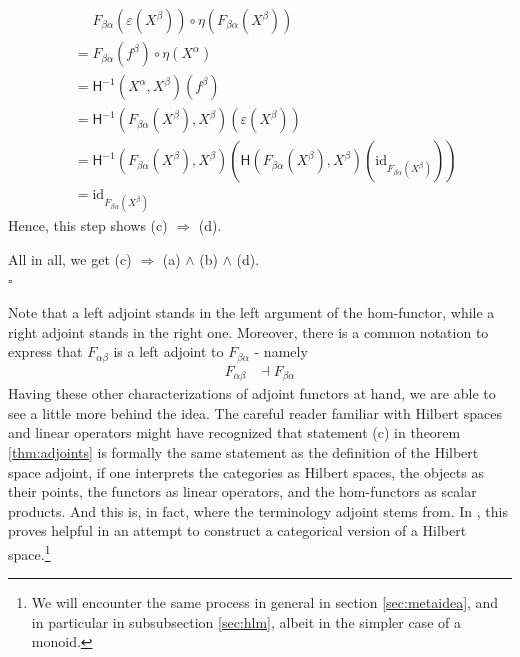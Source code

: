\begin{prf}
\begin{description}
\begin{align*}
  &\phantom{=}
  F_{\beta\alpha}
  \left(
    \varepsilon(X^{\beta})
  \right)
  \circ
  \eta
  \left(
    F_{\beta\alpha}(X^{\beta})
  \right)
  \\
  &=
  F_{\beta\alpha}(f^{\beta})
  \circ
  \eta(X^{\alpha})
  \\
  &=
  \mathsf{H}^{-1}(X^{\alpha},X^{\beta})(f^{\beta})
  \\
  &=
  \mathsf{H}^{-1}
  \left(
    F_{\beta\alpha}(X^{\beta}),
    X^{\beta}
  \right)
  \left(
    \varepsilon(X^{\beta})
  \right)
  \\
  &=
  \mathsf{H}^{-1}
  \left(
    F_{\beta\alpha}(X^{\beta}),
    X^{\beta}
  \right)
  \left(
    \mathsf{H}
    \left(
      F_{\beta\alpha}(X^{\beta}),
      X^{\beta}
    \right)
    \left(
      \mathrm{id}_{F_{\beta\alpha}(X^{\beta})}
    \right)
  \right)
  \\
  &=
  \mathrm{id}_{F_{\beta\alpha}(X^{\beta})}
\end{align*}
Hence, this step shows {\glqq}(c) $\Rightarrow$ (d){\grqq}.
\end{description}
All in all, we get {\glqq}(c) $\Rightarrow$ (a) $\land$ (b) $\land$ (d){\grqq}.
\\
\phantom{proven}
\hfill
$\square$
\end{prf}
Note that a left adjoint stands in the left argument of the hom-functor, while a right adjoint stands in the right one.
Moreover, there is a common notation to express that $F_{\alpha\beta}$ is a left adjoint to $F_{\beta\alpha}$ - namely
\begin{align*}
  F_{\alpha\beta}
  &\dashv
  F_{\beta\alpha}
\end{align*}
Having these other characterizations of adjoint functors at hand, we are able to see a little more behind the idea.
The careful reader familiar with Hilbert spaces and linear operators might have recognized that statement (c) in theorem \ref{thm:adjoints} is formally the same statement as the definition of the Hilbert space adjoint, if one interprets the categories as Hilbert spaces, the objects as their points, the functors as linear operators, and the hom-functors as scalar products.
And this is, in fact, where the terminology {\glqq}adjoint{\grqq} stems from.
In \cite{2148248a}, this proves helpful in an attempt to construct a categorical version of a Hilbert space.\footnote{We will encounter the same process in general in section \ref{sec:metaidea}, and in particular in subsubsection \ref{sec:hlm}, albeit in the simpler case of a monoid.}
